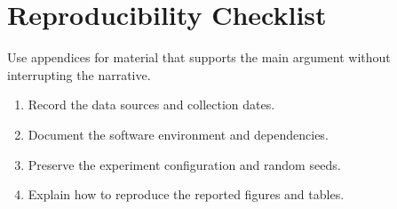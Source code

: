 \chapter{Reproducibility Checklist}
\label{app:reproducibility}

Use appendices for material that supports the main argument without interrupting
the narrative.

\begin{enumerate}
    \item Record the data sources and collection dates.
    \item Document the software environment and dependencies.
    \item Preserve the experiment configuration and random seeds.
    \item Explain how to reproduce the reported figures and tables.
\end{enumerate}
